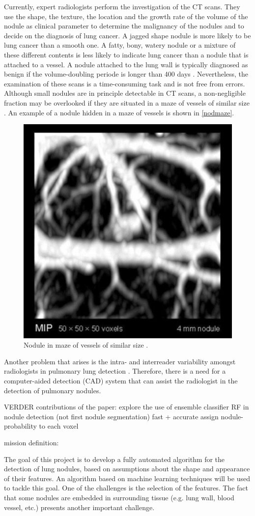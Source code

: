 Currently, expert radiologists perform the investigation of the
CT scans. They use the shape, the texture, the location and the growth rate of
the volume of the nodule as clinical parameter to determine the malignancy of
the nodules and to decide on the diagnosis of lung cancer. A jagged shape
nodule is more likely to be lung cancer than a smooth one. A fatty, bony,
watery nodule or a mixture of these different contents is less likely to
indicate lung cancer than a nodule that is attached to a vessel. A nodule
attached to the lung wall is typically diagnosed as benign if the
volume-doubling periode is longer than 400 days \cite{wu}. Nevertheless, the
examination of these scans is a time-consuming task and is not free from errors.
Although small nodules are in principle detectable in CT scans, a non-negligible
fraction may be overlooked if they are situated in a maze of vessels of similar
size \cite{ozekes}. An example of a nodule hidden in a maze of vessels is shown
in \autoref{nodmaze}.
\begin{figure}[htp]
\begin{center}
  \includegraphics[width= 30 mm]{img/noduleMaze.png}
  \caption{Nodule in maze of vessels of similar size \cite{noduleMaze}.}
  \label{nodmaze}
\end{center}
\end{figure}
Another problem that arises is the intra- and interreader variability
amongst radiologists in pulmonary lung detection \cite{armato} \cite{hens}. Therefore,
there is a need for a computer-aided detection (CAD) system that can assist the
radiologist in the detection of pulmonary nodules.

VERDER
contributions of the paper: explore the use of ensemble classifier RF in nodule detection (not first nodule
segmentation)
fast + accurate
assign nodule-probability to each voxel


mission definition:

The goal of this project is to develop a fully automated algorithm for the
detection of lung nodules, based on assumptions about the shape and appearance of their
features. An algorithm based on machine learning techniques will be used to
tackle this goal. One of the challenges is the selection of the features. The
fact that some nodules are embedded in surrounding tissue (e.g.
lung wall, blood vessel, etc.) presents another important challenge.



